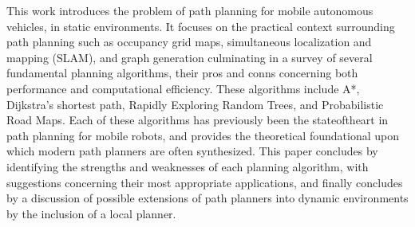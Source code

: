 This work introduces the problem of path planning for mobile autonomous vehicles, in static environments. It focuses on the practical context surrounding path planning such as occupancy grid maps, simultaneous localization and mapping (SLAM), and graph generation culminating in a survey of several fundamental planning algorithms, their pros and conns concerning both performance and computational efficiency. These algorithms include A*, Dijkstra's shortest path, Rapidly Exploring Random Trees, and Probabilistic Road Maps. Each of these algorithms has previously been the stateoftheart in path planning for mobile robots, and provides the theoretical foundational upon which modern path planners are often synthesized. This paper concludes by identifying the strengths and weaknesses of each planning algorithm, with suggestions concerning their most appropriate applications, and finally concludes by a discussion of possible extensions of path planners into dynamic environments by the inclusion of a local planner.  
